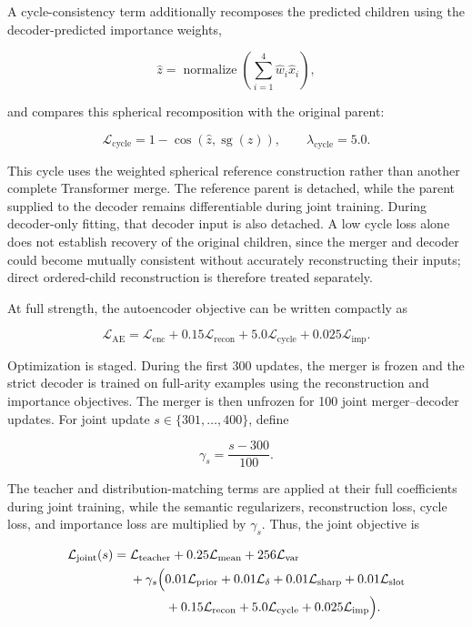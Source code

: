 \documentclass[10pt]{article}
\begin{document}
A cycle-consistency term additionally recomposes the predicted children using the decoder-predicted importance weights,

\[
\hat{z}
=
\operatorname{normalize}\!\left(
\sum_{i=1}^{4}\hat{w}_i\hat{x}_i
\right),
\]

and compares this spherical recomposition with the original parent:

\[
\mathcal{L}_{\mathrm{cycle}}
=
1-\operatorname{cos}(\hat{z},\operatorname{sg}(z)),
\qquad
\lambda_{\mathrm{cycle}}=5.0.
\]

This cycle uses the weighted spherical reference construction rather than
another complete Transformer merge. The reference parent is detached, while
the parent supplied to the decoder remains differentiable during joint
training. During decoder-only fitting, that decoder input is also detached. A low cycle loss alone does not establish recovery of the original children, since the merger and decoder could become mutually consistent without accurately reconstructing their inputs; direct ordered-child reconstruction is therefore treated separately.

At full strength, the autoencoder objective can be written compactly as

\[
\mathcal{L}_{\mathrm{AE}}
=
\mathcal{L}_{\mathrm{enc}}
+0.15\mathcal{L}_{\mathrm{recon}}
+5.0\mathcal{L}_{\mathrm{cycle}}
+0.025\mathcal{L}_{\mathrm{imp}}.
\]

Optimization is staged. During the first 300 updates, the merger is frozen and the strict decoder is trained on full-arity examples using the reconstruction and importance objectives. The merger is then unfrozen for 100 joint merger--decoder updates. For joint update \(s\in\{301,\ldots,400\}\), define

\[
\gamma_s=\frac{s-300}{100}.
\]

The teacher and distribution-matching terms are applied at their full coefficients during joint training, while the semantic regularizers, reconstruction loss, cycle loss, and importance loss are multiplied by \(\gamma_s\). Thus, the joint objective is

\[
\begin{aligned}
\mathcal{L}_{\mathrm{joint}}(s)
={}&
\mathcal{L}_{\mathrm{teacher}}
+0.25\mathcal{L}_{\mathrm{mean}}
+256\mathcal{L}_{\mathrm{var}}\\
&+\gamma_s\Bigl(
0.01\mathcal{L}_{\mathrm{prior}}
+0.01\mathcal{L}_{\delta}
+0.01\mathcal{L}_{\mathrm{sharp}}
+0.01\mathcal{L}_{\mathrm{slot}}\\
&\hspace{2.8em}
+0.15\mathcal{L}_{\mathrm{recon}}
+5.0\mathcal{L}_{\mathrm{cycle}}
+0.025\mathcal{L}_{\mathrm{imp}}
\Bigr).
\end{aligned}
\]
\end{document}
